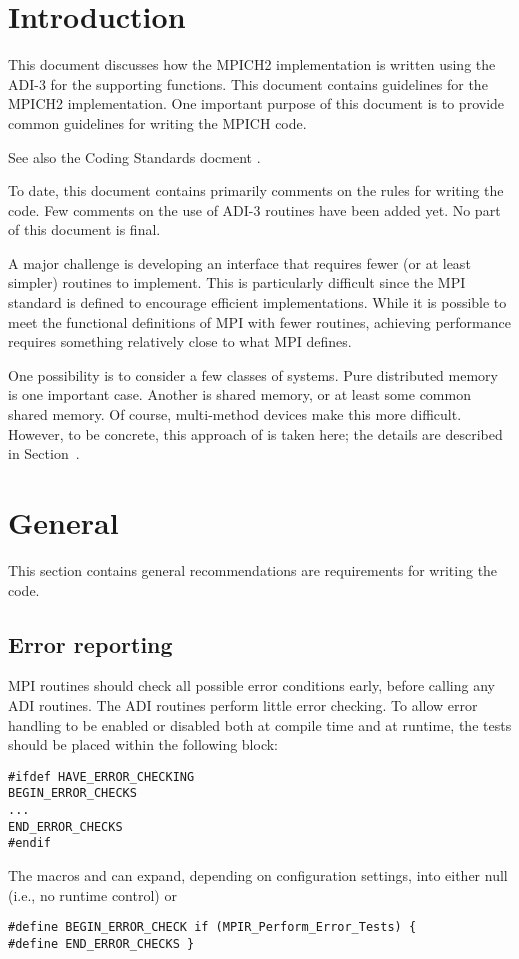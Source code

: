\documentclass{article}
\begin{document}
\clearpage

\tableofcontents
\clearpage

\raggedright
{}
\pagestyle{headings}

\section{Introduction}
This document discusses how the MPICH2 implementation is written using
the ADI-3 \cite{adi3man} for the supporting functions.  This document
contains guidelines for the MPICH2 implementation.  One important
purpose of this document is to provide common guidelines for writing
the MPICH code.

See also the Coding Standards docment \cite{coding-standards}.

To date, this document contains primarily comments on the rules for
writing the code.  Few comments on the use of ADI-3 routines have been
added yet.  No part of this document is final.

A major challenge is developing an interface that requires fewer (or
at least simpler) routines to implement.  This is particularly
difficult since the MPI standard is defined to encourage efficient
implementations.  While it is possible to meet the functional
definitions of MPI with fewer routines, achieving performance requires
something relatively close to what MPI defines.

One possibility is to consider a few classes of systems.  Pure
distributed memory is one important case.  Another is shared memory,
or at least some common shared memory.  Of course, multi-method
devices make this more difficult.  However, to be concrete, this
approach of is taken here; the details are described in
Section~\label{sec-mpi-operations}.

\section{General}
This section contains general recommendations are requirements for
writing the code.

\subsection{Error reporting}

MPI routines should check all possible error conditions early, before
calling any ADI routines.  The ADI routines perform little error
checking.  To allow error handling to be enabled or disabled both at compile
time 
and at runtime, the tests should be placed within the following block:
\begin{verbatim}
#ifdef HAVE_ERROR_CHECKING
BEGIN_ERROR_CHECKS
...
END_ERROR_CHECKS
#endif
\end{verbatim}
The macros  and  can
expand, depending on configuration settings, into either null (i.e.,
no runtime control) or 
\begin{verbatim}
#define BEGIN_ERROR_CHECK if (MPIR_Perform_Error_Tests) {
#define END_ERROR_CHECKS }
\end{verbatim}
\end{document}
